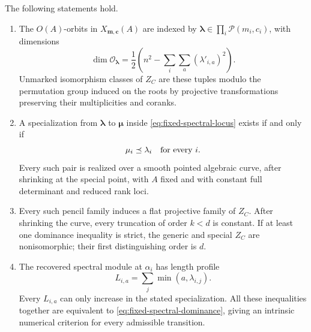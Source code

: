 \begin{theorem}
\label{thm:fixed-spectral-classification}
The following statements hold.
\begin{enumerate}
\item The \(O(A)\)-orbits in \(X_{\boldsymbol m,\boldsymbol c}(A)\)
are indexed by \(\boldsymbol\lambda\in\prod_i\mathcal P(m_i,c_i)\),
with dimensions
\begin{equation}\label{eq:fixed-spectral-orbit-dimension}
 \dim\mathcal O_{\boldsymbol\lambda}
 =\frac12\left(n^2-\sum_i\sum_a(\lambda'_{i,a})^2\right).
\end{equation}
Unmarked isomorphism classes of \(Z_C\) are these tuples modulo
the permutation group induced on the roots by projective transformations
preserving their multiplicities and coranks.
\item A specialization from \(\boldsymbol\lambda\) to
\(\boldsymbol\mu\) inside \eqref{eq:fixed-spectral-locus}
exists if and only if
\begin{equation}\label{eq:fixed-spectral-dominance}
                 \mu_i\preceq\lambda_i\quad\hbox{for every }i.
\end{equation}
Every such pair is realized over a smooth pointed algebraic curve,
after shrinking at the special point, with \(A\) fixed and with
constant full determinant and reduced rank loci.
\item Every such pencil family induces a flat projective family of
\(Z_C\). After shrinking the curve, every truncation of order
\(k<d\) is constant. If at least one dominance inequality is
strict, the generic and special \(Z_C\) are nonisomorphic;
their first distinguishing order is \(d\).
\item The recovered spectral module at \(\alpha_i\) has length
profile
\begin{equation}\label{eq:fixed-spectral-lengths}
                 L_{i,a}=\sum_j\min(a,\lambda_{i,j}).
\end{equation}
Every \(L_{i,a}\) can only increase in the stated specialization.
All these inequalities together are equivalent to
\eqref{eq:fixed-spectral-dominance}, giving an intrinsic numerical
criterion for every admissible transition.
\end{enumerate}
\end{theorem}
